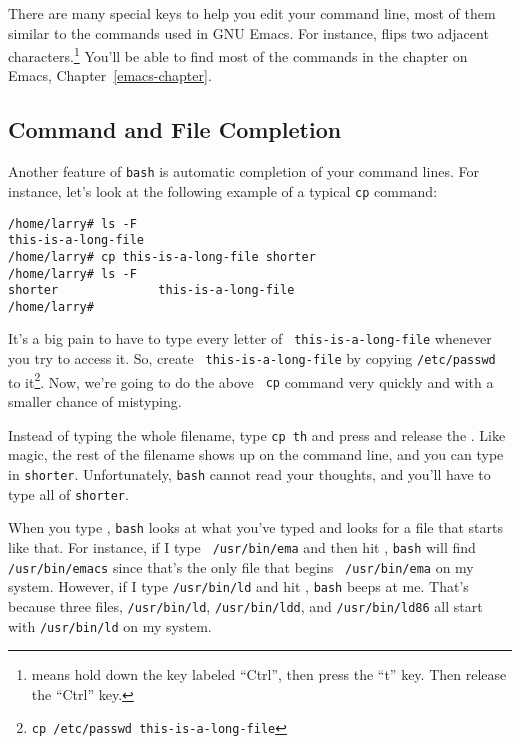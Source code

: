 There are many special keys to help you edit your command line, most of
them similar to the commands used in GNU Emacs. For
instance,  flips two adjacent characters.\footnote{ means
hold down the key labeled ``Ctrl'', then press the ``t'' key. Then release
the ``Ctrl'' key.} You'll be able to find most of the commands in the
chapter on Emacs, Chapter~\ref{emacs-chapter}.


\subsection{Command and File Completion}

Another feature of {\tt bash} is automatic completion of
your command lines.  For instance, let's look at the following example
of a typical {\tt cp} command:

\begin{screen}\begin{verbatim}
/home/larry# ls -F
this-is-a-long-file
/home/larry# cp this-is-a-long-file shorter
/home/larry# ls -F
shorter              this-is-a-long-file
/home/larry# 
\end{verbatim}\end{screen}

It's a big pain to have to type every letter of {\tt
  this-is-a-long-file} whenever you try to access it.  So, create {\tt
  this-is-a-long-file} by copying {\tt /etc/passwd} to it\footnote{\tt cp
  /etc/passwd this-is-a-long-file}. Now, we're going to do the above {\tt
  cp} command very quickly and with a smaller chance of mistyping.

Instead of typing the whole filename, type {\tt cp th} and press and
release the . Like magic, the rest of the filename shows up
on the command line, and you can type in {\tt shorter}. Unfortunately,
{\tt bash} cannot read your thoughts, and you'll have to
type all of {\tt shorter}.

When you type , {\tt bash} looks at what you've typed and
looks for a file that starts like that. For instance, if I type {\tt
  /usr/bin/ema} and then hit , {\tt bash} will find {\tt
  /usr/bin/emacs} since that's the only file that begins {\tt
  /usr/bin/ema} on my system. However, if I type {\tt /usr/bin/ld} and
hit , {\tt bash} beeps at me. That's because three files,
{\tt /usr/bin/ld}, {\tt /usr/bin/ldd}, and {\tt /usr/bin/ld86} all
start with {\tt /usr/bin/ld} on my system.

